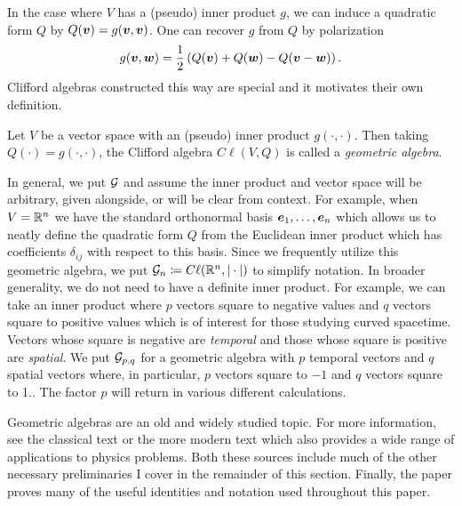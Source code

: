 In the case where $V$ has a (pseudo) inner product $g$, we can induce a quadratic form $Q$ by $Q(\boldsymbol{v})=g(\boldsymbol{v},\boldsymbol{v})$. One can recover $g$ from $Q$ by polarization
\begin{equation}
g(\boldsymbol{v},\boldsymbol{w})=\frac{1}{2} \left(Q(\boldsymbol{v})+Q(\boldsymbol{w})-Q(\boldsymbol{v}-\boldsymbol{w})\right).
\end{equation}
Clifford algebras constructed this way are special and it motivates their own definition.
\begin{definition}
Let $V$ be a vector space with an (pseudo) inner product $g(\cdot,\cdot)$. Then taking $Q(\cdot) = g(\cdot,\cdot)$, the Clifford algebra $C \ell(V,Q)$ is called a \emph{geometric algebra}.
\end{definition}
In general, we put $\mathcal{G}$ and assume the inner product and vector space will be arbitrary, given alongside, or will be clear from context.  For example, when $V=\mathbb{R}^n$ we have the standard orthonormal basis $\boldsymbol{e}_1,\dots,\boldsymbol{e}_n$ which allows us to neatly define the quadratic form $Q$ from the Euclidean inner product which has coefficients $\delta_{ij}$ with respect to this basis. Since we frequently utilize this geometric algebra, we put $\mathcal{G}_n \coloneqq C\ell(\mathbb{R}^n, |\cdot|)$ to simplify notation.  In broader generality, we do not need to have a definite inner product. For example, we can take an inner product where $p$ vectors square to negative values and $q$ vectors square to positive values which is of interest for those studying curved spacetime. Vectors whose square is negative are \emph{temporal} and those whose square is positive are \emph{spatial}. We put $\mathcal{G}_{p,q}$ for a geometric algebra with $p$ temporal vectors and $q$ spatial vectors where, in particular, $p$ vectors square to $-1$ and $q$ vectors square to 1.. The factor $p$ will return in various different calculations.

Geometric algebras are an old and widely studied topic. For more information, see the classical text \cite{hestenes_clifford_1986} or the more modern text \cite{doran_geometric_2003} which also provides a wide range of applications to physics problems. Both these sources include much of the other necessary preliminaries I cover in the remainder of this section. Finally, the paper \cite{chisolm_geometric_2012} proves many of the useful identities and notation used throughout this paper.

